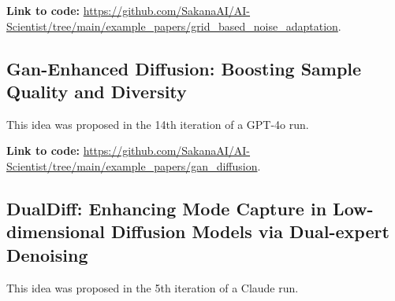 \documentclass[11pt, a4paper]{include/gdm_format}
\begin{document}
\textbf{Link to code:} \url{https://github.com/SakanaAI/AI-Scientist/tree/main/example_papers/grid_based_noise_adaptation}.


\label{paper:grid_based_noise_adaptation}
\begin{tcolorbox}[breakable, colback=green!5!white, colframe=green!75!black, title=Review]
{\small  }
\end{tcolorbox}

\clearpage
%
\subsection{Gan-Enhanced Diffusion: Boosting Sample Quality and Diversity}

This idea was proposed in the 14th iteration of a GPT-4o run.

\begin{tcolorbox}[colback=blue!5!white, colframe=blue!75!black, title=Idea]
{\small  }
\end{tcolorbox}

\textbf{Link to code:} \url{https://github.com/SakanaAI/AI-Scientist/tree/main/example_papers/gan_diffusion}.


\label{paper:gan_diffusion}
\begin{tcolorbox}[breakable, colback=green!5!white, colframe=green!75!black, title=Review]
{\small  }
\end{tcolorbox}

\clearpage
%
\subsection{DualDiff: Enhancing Mode Capture in Low-dimensional Diffusion Models via Dual-expert Denoising}

This idea was proposed in the 5th iteration of a Claude run.

\begin{tcolorbox}[colback=blue!5!white, colframe=blue!75!black, title=Idea]
{\small  }
\end{tcolorbox}
\end{document}
